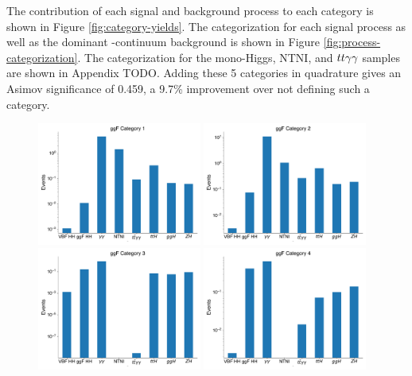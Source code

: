 The contribution of each signal and background process to each category is shown in Figure \ref{fig:category-yields}. The categorization for each signal process as well as the dominant \yy-continuum background is shown in Figure \ref{fig:process-categorization}. The categorization for the mono-Higgs, \gls{NTNI}, and $tt\gamma\gamma$ samples are shown in Appendix TODO. Adding these 5 categories in quadrature gives an Asimov significance of 0.459, a 9.7\% improvement over not defining such a category.

\begin{figure}[p!]
  \centering
  \includegraphics[width=0.48\textwidth]{chapters/chapter6_vbf/images/category_breakdown/ggfcat1.pdf}
  \includegraphics[width=0.48\textwidth]{chapters/chapter6_vbf/images/category_breakdown/ggfcat2.pdf}
  \includegraphics[width=0.48\textwidth]{chapters/chapter6_vbf/images/category_breakdown/ggfcat3.pdf}
  \includegraphics[width=0.48\textwidth]{chapters/chapter6_vbf/images/category_breakdown/ggfcat4.pdf}

\end{figure}
